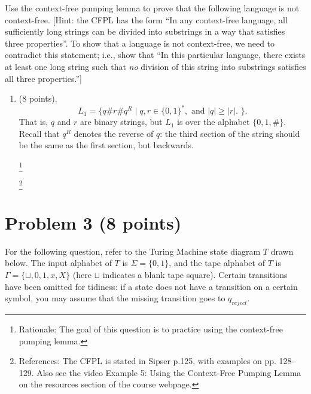 \documentclass[letterpaper,11pt,twoside]{article}
\theoremstyle{plain}
\theoremstyle{definition}
\theoremstyle{remark}
\theoremstyle{restate}
\newcommand\blfootnote[1]{%
  \begingroup
  \renewcommand\thefootnote{}\footnote{#1}%
  \addtocounter{footnote}{-1}%
  \endgroup
}
\begin{document}
Use the context-free pumping lemma to prove that the following language is not context-free. [Hint: the CFPL has the form ``In any context-free language, all sufficiently long strings can be divided into substrings in a way that satisfies three properties''. To show that a language is not context-free, we need to contradict this statement; i.e., show that ``In this particular language, there exists at least one long string such that \emph{no} division of this string into substrings satisfies all three properties.'']
\begin{enumerate}
    \item (8 points).
    \[
        L_1 = \{ q \# r \# q^R \; | \; q, r \in \{0,1\}^*, \text{ and $|q| \geq |r|$. }\}.
    \]
    That is, $q$ and $r$ are binary strings, but $L_1$ is over the alphabet $\{0, 1, \#\}$. Recall that $q^R$ denotes the reverse of $q$: the third section of the string should be the same as the first section, but backwards.
    
    \blfootnote{ Rationale: The goal of this question is to practice using the context-free pumping lemma. }
    \blfootnote{ References: The CFPL is stated in Sipser p.125, with examples on pp. 128-129. Also see the video Example 5: Using the Context-Free Pumping Lemma on the resources section of the course webpage. }
\end{enumerate}



\clearpage
\section*{Problem 3 (8 points)}
    For the following question, refer to the Turing Machine state diagram $T$ drawn below. The input alphabet of $T$ is $\Sigma = \{0, 1\}$, and the tape alphabet of $T$ is $\Gamma = \{\sqcup, 0, 1, x, X\}$ (here $\sqcup$ indicates a blank tape square). Certain transitions have been omitted for tidiness: if a state does not have a transition on a certain symbol, you may assume that the missing transition goes to $q_{reject}$.
    
\end{document}
